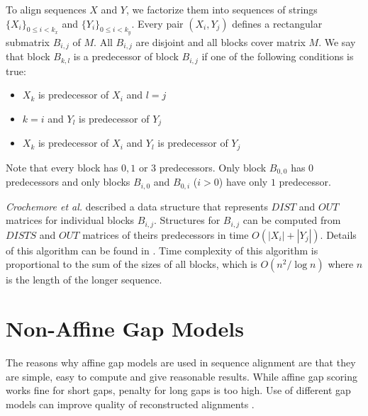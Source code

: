 To align sequences $X$ and $Y$, we factorize them into sequences of strings
$\{X_i\}_{0\leq i < k_x}$ and $\{Y_i\}_{0\leq i<k_y}$.  Every pair $(X_i,Y_j)$
defines a rectangular submatrix $B_{i,j}$ of $M$.  All $B_{i,j}$ are
disjoint and all blocks cover matrix $M$. We say that block $B_{k,l}$ is
a predecessor of block $B_{i,j}$ if one of the following conditions is true:


\begin{itemize}
\item $X_k$ is predecessor of $X_i$ and $l=j$
\item $k=i$ and $Y_l$ is predecessor of $Y_j$
\item $X_k$ is predecessor of $X_i$ and $Y_l$ is predecessor of $Y_j$
\end{itemize}

Note that every block has $0,1$ or $3$ predecessors. Only block
$B_{0,0}$ has $0$ predecessors and only blocks $B_{i,0}$ and $B_{0,i}$
($i>0$) have only $1$ predecessor.  

{\it Crochemore et al.} described a data structure that represents $DIST$ and $OUT$
matrices for  \nocite{Crochemore2002} individual blocks $B_{i,j}$. Structures
for $B_{i,j}$ can be
computed from $DISTS$ and $OUT$ matrices of theirs predecessors in time
$O(|X_i|+|Y_j|)$. Details of this algorithm can be found in
\cite{Crochemore2002}. Time complexity of this algorithm is proportional to the
sum of the sizes of all blocks, which is $O(n^2/\log n)$ where $n$ is the length
of the longer sequence.





\section{Non-Affine Gap Models} 


The reasons why affine gap models are
used in sequence alignment are that they are simple, easy to compute and give
reasonable results. While affine gap scoring works fine for short gaps, penalty
for long gaps is too high. Use of different gap models can improve quality of
reconstructed alignments \cite{Gill2004,Cartwright2009}.

